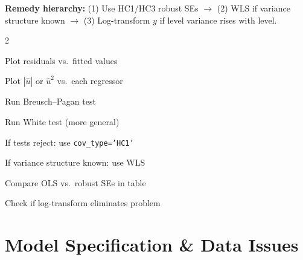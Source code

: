 \documentclass[10pt,a4paper]{article}
\begin{document}
\textbf{Remedy hierarchy:} (1) Use HC1/HC3 robust SEs $\to$ (2) WLS if variance structure known $\to$ (3) Log-transform $y$ if level variance rises with level.

\begin{tcolorbox}[checklist]
\begin{multicols}{2}
\begin{checklist}
  \item Plot residuals vs.\ fitted values
  \item Plot $|\hat{u}|$ or $\hat{u}^2$ vs.\ each regressor
  \item Run Breusch--Pagan test
  \item Run White test (more general)
  \item If tests reject: use \texttt{cov\_type='HC1'}
  \item If variance structure known: use WLS
  \item Compare OLS vs.\ robust SEs in table
  \item Check if log-transform eliminates problem
\end{checklist}
\end{multicols}
\end{tcolorbox}

\section{Model Specification \& Data Issues}
\end{document}
